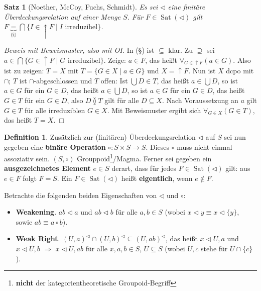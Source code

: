 \documentclass[headsepline=true,DIV=11]{scrartcl}
\newtheorem*{theorem}{Satz}
\theoremstyle{definition}
\newtheorem*{definition}{Definition}
\newenvironment{gelaber}{}{}
\newcommand{\Sat}{\operatorname{Sat}}
\begin{document}
\begin{theorem}[Noether, McCoy, Fuchs, Schmidt]
  Es sei $\lhd$ eine finitäre Überdeckungsrelation auf einer Menge $S$. Für $F\in\Sat(\lhd)$ gilt $F\underbrace{=}_{\mbox{(§)}}\bigcap\{I\in\uparrow
  F\mid I\mbox{ irreduzibel}\}$.
\end{theorem}

\begin{proof}[Beweis mit Beweismuster, also mit OI]
  In (§) ist $\subseteq$ klar. Zu $\supseteq$ sei $a\in\bigcap\{G\in\uparrow F\mid G\mbox{ irreduzibel}\}$. Zeige: $a\in F$, das heißt
  $\forall_{G\in\uparrow F}(a\in G)$. Also ist zu zeigen: $T=X$ mit $T=\{G\in X\mid a\in G\}$ und $X=\uparrow F$. Nun ist $X$ dcpo mit $\cap$; $T$ ist
  $\cap$-abgeschlossen und $T$ offen: Ist $\bigcup D\in T$, das heißt $a\in\bigcup D$, so ist $a\in G$ für ein $G\in D$, das heißt $a\in\bigcup D$, so
  ist $a\in G$ für ein $G\in D$, das heißt $G\in T$ für ein $G\in D$, also $D\between T$ gilt für alle $D\subseteq X$. Nach Voraussetzung an $a$ gilt
  $G\in T$ für alle irreduziblen $G\in X$. Mit Beweismuster ergibt sich $\forall_{G\in X}(G\in T)$, das heißt $T=X$.
\end{proof}

\begin{definition}
  Zusätzlich zur (finitären) Überdeckungsrelation $\lhd$ auf $S$ sei nun gegeben eine {\bf binäre Operation} $\circ:S\times S\rightarrow S$. Dieses
  $\circ$ muss nicht einmal assoziativ sein. $(S,\circ)$ Grouppoid\footnote{{\bf nicht} der kategorientheoretische Groupoid-Begriff}/Magma. Ferner sei
  gegeben ein {\bf ausgezeichnetes Element} $e\in S$ derart, dass für jedes $F\in\Sat(\lhd)$ gilt: aus $e\in F$ folgt $F=S$. Ein $F\in\Sat(\lhd)$
  heißt {\bf eigentlich}, wenn $e\not\in F$.
\end{definition}

\begin{gelaber}
  Betrachte die folgenden beiden Eigenschaften von $\lhd$ und $\circ$:
  \begin{itemize}
    \item {\bf Weakening}. $ab\lhd a$ und $ab\lhd b$ für alle $a,b\in S$ (wobei $x\lhd y \equiv x\lhd\{y\}$, sowie $ab\equiv a\circ b$).
    \item {\bf Weak Right}. $(U,a)^\lhd\cap (U,b)^\lhd\subseteq (U,ab)^\lhd$, das heißt $x\lhd U, a$ und $x\lhd U,b$ $\Rightarrow$ $x\lhd U,ab$ für
      alle $x,a,b\in S$, $U\subseteq S$ (wobei $U,c$ stehe für $U\cap\{c\}$).
  \end{itemize}
\end{gelaber}
\end{document}
